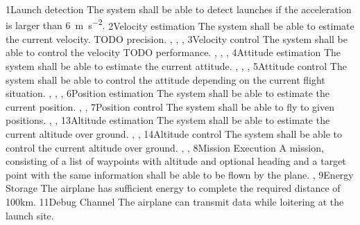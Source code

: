 \req
    {1}{Launch detection}
    {
        The system shall be able to detect launches if the
        acceleration is larger than \SI{6}{\meter \per \second^2}.
    }
    {
    }
    {}
\req
    {2}{Velocity estimation}
    {
        The system shall be able to estimate the current velocity.   
        TODO precision.
    }
    {
        , , , 
    }
    {}
\req
    {3}{Velocity control}
    {
        The system shall be able to control the velocity
        TODO performance.
    }
    {
        , , , 
    }
    {}
\req
    {4}{Attitude estimation}
    {
        The system shall be able to estimate the current attitude.   
    }
    {
        , , , 
    }
    {}
\req
    {5}{Attitude control}
    {
        The system shall be able to control the attitude depending on
        the current flight situation.
    }
    {
        , , , 
    }
    {}
\req
    {6}{Position estimation}
    {
        The system shall be able to estimate the current position.
    }
    {
        , , 
    }
    {}
\req
    {7}{Position control}
    {
        The system shall be able to fly to given positions.
    }
    {
        , , 
    }
    {}
\req
    {13}{Altitude estimation}
    {
        The system shall be able to estimate the current altitude over ground.
    }
    {
        , , 
    }
    {}
\req
    {14}{Altitude control}
    {
        The system shall be able to control the current altitude over ground.
    }
    {
        , , 
    }
    {}
\req
    {8}{Mission Execution}
    {
        A mission, consisting of a list of waypoints with altitude
        and optional heading 
        and a target point with the same information shall be able 
        to be flown by the plane.
    }
    {, }
    {}
\req
    {9}{Energy Storage}
    {
        The airplane has sufficient energy to complete the required distance
        of 100km.
    }
    {}
    {}
\req
    {11}{Debug Channel}
    {
        The airplane can transmit data while loitering
        at the launch site.
    }
